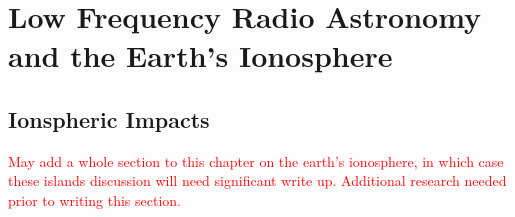 \chapter{Low Frequency Radio Astronomy and the Earth's Ionosphere}\label{Ch:Iono}

\section{Ionspheric Impacts}

\textcolor{red}{May add a whole section to this chapter on the earth's ionosphere, in which case these islands discussion will need significant write up. Additional research needed prior to writing this section. }
